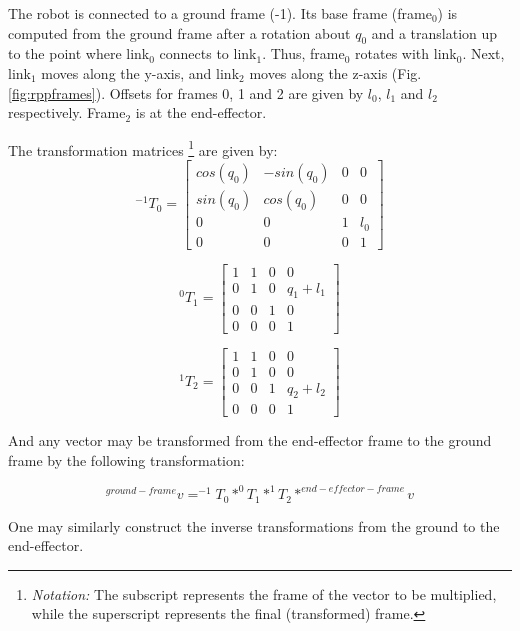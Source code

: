 \documentclass[12pt]{article}
\begin{document}
The robot is connected to a ground frame (-1). Its base frame (frame$_0$) is computed
from the ground frame after a rotation about $q_0$ and a translation up to the
point where link$_0$ connects to link$_1$. Thus, frame$_0$ rotates with link$_0$.
Next, link$_1$ moves along the y-axis, and link$_2$ moves along the z-axis (Fig. \ref{fig:rppframes}).
Offsets for frames 0, 1 and 2 are given by $l_0$, $l_1$ and $l_2$ respectively. 
Frame$_2$ is at the end-effector.

The transformation matrices
\footnote{{\em Notation:} The subscript represents the frame of the vector to be multiplied, 
while the superscript represents the final (transformed) frame.}
 are given by:
\begin{equation}
  ^{-1} T_{0} = 
  \begin{bmatrix} 
  cos(q_0) & -sin(q_0) & 0 & 0 \\ 
  sin(q_0) & cos(q_0) & 0 & 0 \\
  0 & 0 & 1 & l_{0} \\
  0 & 0 & 0 & 1 
  \end{bmatrix}
\end{equation}

\begin{equation}
  ^0 T_{1} = 
  \begin{bmatrix} 
  1 & 1 & 0 & 0 \\ 
  0 & 1 & 0 & q_1+l_{1} \\
  0 & 0 & 1 & 0 \\
  0 & 0 & 0 & 1 
  \end{bmatrix}
\end{equation}

\begin{equation}
  ^1 T_{2} = 
  \begin{bmatrix} 
  1 & 1 & 0 & 0 \\ 
  0 & 1 & 0 & 0 \\
  0 & 0 & 1 & q_2+l_{2} \\
  0 & 0 & 0 & 1 
  \end{bmatrix}
\end{equation}

And any vector may be transformed from the end-effector frame to the ground
frame by the following transformation:

\begin{equation}
  ^{ground-frame} v =  ^{-1} T_0 * ^0 T_1 * ^1 T_2 * ^{end-effector-frame} v
\end{equation}

One may similarly construct the inverse transformations from the ground to the end-effector.
\end{document}
